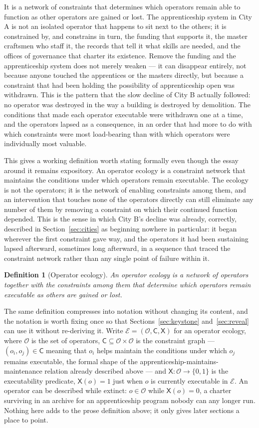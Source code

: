 \documentclass[11pt]{article}
\newtheorem{definition}{Definition}[section]
\newcommand{\Op}{\mathcal{O}}
\newcommand{\Ecol}{\mathcal{E}}
\newcommand{\Ex}{\mathsf{X}}
\newcommand{\Cst}{\mathsf{C}}
\begin{document}
It is a network of constraints that
determines which operators remain able to function as other operators
are gained or lost. The apprenticeship system in City A is not an
isolated operator that happens to sit next to the others; it is
constrained by, and constrains in turn, the funding that supports it,
the master craftsmen who staff it, the records that tell it what
skills are needed, and the offices of governance that charter its
existence. Remove the funding and the apprenticeship system does not
merely weaken --- it can disappear entirely, not because anyone
touched the apprentices or the masters directly, but because a
constraint that had been holding the possibility of apprenticeship
open was withdrawn. This is the pattern that the slow decline of City
B actually followed: no operator was destroyed in the way a building
is destroyed by demolition. The conditions that made each operator
executable were withdrawn one at a time, and the operators lapsed as
a consequence, in an order that had more to do with which constraints
were most load-bearing than with which operators were individually
most valuable.

This gives a working definition worth stating formally even though
the essay around it remains expository. An operator ecology is a
constraint network that maintains the conditions under which
operators remain executable. The ecology is not the operators; it is
the network of enabling constraints among them, and an intervention
that touches none of the operators directly can still eliminate any
number of them by removing a constraint on which their continued
function depended. This is the sense in which City B's decline was
already, correctly, described in Section~\ref{sec:cities} as
beginning nowhere in particular: it began wherever the first
constraint gave way, and the operators it had been sustaining lapsed
afterward, sometimes long afterward, in a sequence that traced the
constraint network rather than any single point of failure within it.

\begin{definition}[Operator ecology]
An \emph{operator ecology} is a network of operators together with
the constraints among them that determine which operators remain
executable as others are gained or lost.
\end{definition}

The same definition compresses into notation without changing its
content, and the notation is worth fixing once so that
Sections~\ref{sec:keystone} and~\ref{sec:reveal} can use it without
re-deriving it. Write $\Ecol=(\Op,\Cst,\Ex)$ for an operator ecology,
where $\Op$ is the set of operators, $\Cst\subseteq\Op\times\Op$ is
the constraint graph --- $(o_i,o_j)\in\Cst$ meaning that $o_i$ helps
maintain the conditions under which $o_j$ remains executable, the
formal shape of the apprenticeship-maintains-maintenance relation
already described above --- and $\Ex:\Op\to\{0,1\}$ is the
executability predicate, $\Ex(o)=1$ just when $o$ is currently
executable in $\Ecol$. An operator can be described while extinct:
$o\in\Op$ while $\Ex(o)=0$, a charter surviving in an archive for an
apprenticeship program nobody can any longer run. Nothing here adds
to the prose definition above; it only gives later sections a place
to point.
\end{document}
